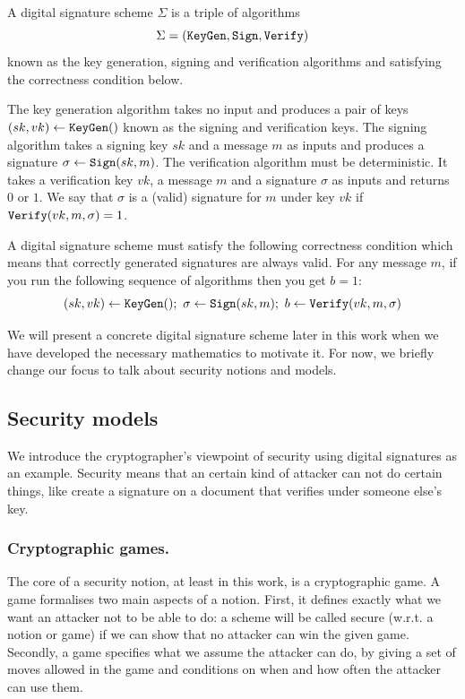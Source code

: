\documentclass[envcountsame]{llncs}
\newcommand{\alg}[1]{\textup{\texttt{#1}}}
\begin{document}
\begin{definition}
A digital signature scheme $\Sigma$ is a triple of algorithms
\[
\Sigma = \left( \alg{KeyGen}, \alg{Sign}, \alg{Verify} \right)
\]
known as the key generation, signing and verification algorithms and satisfying
the correctness condition below.

The key generation algorithm takes no input and produces a pair of keys $(sk,
vk) \gets \alg{KeyGen}()$ known as the signing and verification keys. The
signing algorithm takes a signing key $sk$ and a message $m$ as inputs and
produces a signature $\sigma \gets \alg{Sign}(sk, m)$. The verification
algorithm must be deterministic. It takes a verification key $vk$, a message $m$
and a signature $\sigma$ as inputs and returns $0$ or $1$. We say that $\sigma$
is a (valid) signature for $m$ under key $vk$ if $\alg{Verify}(vk, m, \sigma) =
1$.

A digital signature scheme must satisfy the following correctness condition
which means that correctly generated signatures are always valid. For any
message $m$, if you run the following sequence of algorithms then you get $b =
1$:
\[
(sk, vk) \gets \alg{KeyGen}();\ \sigma \gets \alg{Sign}(sk, m);\ b \gets \alg{Verify}(vk, m, \sigma)
\]
\end{definition}

We will present a concrete digital signature scheme later in this work when we
have developed the necessary mathematics to motivate it. For now, we briefly
change our focus to talk about security notions and models.

\subsection{Security models}

We introduce the cryptographer's viewpoint of security using digital signatures
as an example. Security means that an certain kind of attacker can not do
certain things, like create a signature on a document that verifies under
someone else's key.

\subsubsection{Cryptographic games.}
The core of a security notion, at least in this work, is a cryptographic game. A
game formalises two main aspects of a notion. First, it defines exactly what we
want an attacker not to be able to do: a scheme will be called secure (w.r.t. a
notion or game) if we can show that no attacker can win the given game.
Secondly, a game specifies what we assume the attacker can do, by giving a set
of moves allowed in the game and conditions on when and how often the attacker
can use them.
\end{document}
